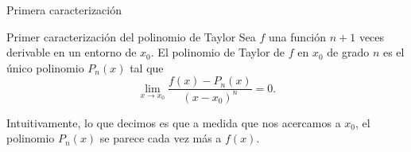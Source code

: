 \begin{frame}{Primera caracterización}
  \begin{exampleblock}{Primer caracterización del polinomio de Taylor}
    Sea $f$ una función $n+1$ veces derivable en un entorno de $x_0$.
    El polinomio de Taylor de $f$ en $x_0$ de grado $n$ es el único
    polinomio $P_n(x)$ tal que
    \[
      \lim_{x \to x_0} \frac{f(x)-P_n(x)}{(x-x_0)^n} = 0.
    \]
  \end{exampleblock}

  Intuitivamente, lo que decimos es que a medida que nos acercamos a $x_0$,
  el polinomio $P_n(x)$ se parece cada vez más a $f(x)$.
\end{frame}
